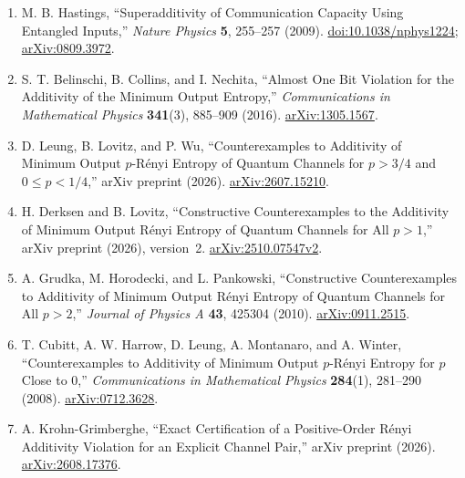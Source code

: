 \begin{enumerate}[label={},leftmargin=4.8em,labelsep=0.5em]
  \footnotesize
  \item[\textup{[Has09]}]\label{ref:dmin-hastings}
  M. B. Hastings,
  ``Superadditivity of Communication Capacity Using Entangled Inputs,''
  \emph{Nature Physics} \textbf{5}, 255--257 (2009).
  \href{https://doi.org/10.1038/nphys1224}{doi:10.1038/nphys1224};
  \href{https://arxiv.org/abs/0809.3972}{arXiv:0809.3972}.

  \item[\textup{[BCN16]}]\label{ref:dmin-belinschi}
  S. T. Belinschi, B. Collins, and I. Nechita,
  ``Almost One Bit Violation for the Additivity of the Minimum Output
  Entropy,'' \emph{Communications in Mathematical Physics} \textbf{341}(3),
  885--909 (2016).
  \href{https://arxiv.org/abs/1305.1567}{arXiv:1305.1567}.

  \item[\textup{[LLW26]}]\label{ref:dmin-leung}
  D. Leung, B. Lovitz, and P. Wu,
  ``Counterexamples to Additivity of Minimum Output $p$-R\'enyi Entropy of
  Quantum Channels for $p>3/4$ and $0\leq p<1/4$,'' arXiv preprint (2026).
  \href{https://arxiv.org/abs/2607.15210}{arXiv:2607.15210}.

  \item[\textup{[DL26]}]\label{ref:dmin-derksen-lovitz}
  H. Derksen and B. Lovitz,
  ``Constructive Counterexamples to the Additivity of Minimum Output
  R\'enyi Entropy of Quantum Channels for All $p>1$,'' arXiv preprint
  (2026), version~2.
  \href{https://arxiv.org/abs/2510.07547v2}{arXiv:2510.07547v2}.

  \item[\textup{[GHP10]}]\label{ref:dmin-grudka}
  A. Grudka, M. Horodecki, and L. Pankowski,
  ``Constructive Counterexamples to Additivity of Minimum Output R\'enyi
  Entropy of Quantum Channels for All $p>2$,'' \emph{Journal of Physics A}
  \textbf{43}, 425304 (2010).
  \href{https://arxiv.org/abs/0911.2515}{arXiv:0911.2515}.

  \item[\textup{[CHLMW08]}]\label{ref:dmin-cubitt}
  T. Cubitt, A. W. Harrow, D. Leung, A. Montanaro, and A. Winter,
  ``Counterexamples to Additivity of Minimum Output $p$-R\'enyi Entropy for
  $p$ Close to 0,'' \emph{Communications in Mathematical Physics}
  \textbf{284}(1), 281--290 (2008).
  \href{https://arxiv.org/abs/0712.3628}{arXiv:0712.3628}.

  \item[\textup{[KG26]}]\label{ref:dmin-krohn}
  A. Krohn-Grimberghe,
  ``Exact Certification of a Positive-Order R\'enyi Additivity Violation for
  an Explicit Channel Pair,'' arXiv preprint (2026).
  \href{https://arxiv.org/abs/2608.17376}{arXiv:2608.17376}.


\end{enumerate}
